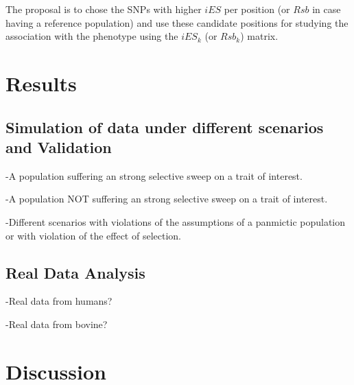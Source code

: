 \documentclass[a4paper,11pt]{article}
\begin{document}

\noindent The proposal is to chose the SNPs with higher $iES$ per position (or $Rsb$ in case having a reference population) and use  these candidate positions for studying the association with the phenotype using the $iES_k$  (or $Rsb_k$) matrix.

\section{Results}
\subsection{Simulation of data under different scenarios and Validation}
\noindent -A  population suffering an strong selective sweep on a trait of interest.\par
\noindent -A  population NOT suffering an strong selective sweep on a trait of interest.\par
\noindent -Different scenarios with violations of the assumptions of a panmictic population or with violation of the effect of selection. %

\subsection{Real Data Analysis}
\noindent -Real data from humans?\par
\noindent -Real data from bovine?\par

\section{Discussion}


\newpage


\end{document}
